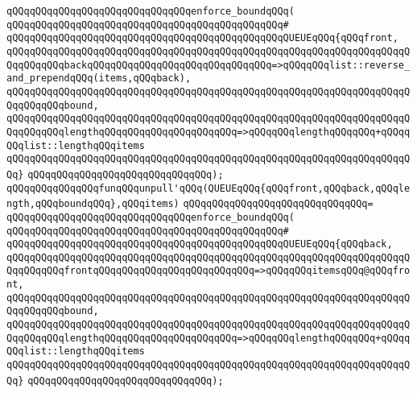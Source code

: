 \verb|qQQqqQQqqQQqqQQqqQQqqQQqqQQqqQQqenforce_boundqQQq(|\newline
\verb|qQQqqQQqqQQqqQQqqQQqqQQqqQQqqQQqqQQqqQQqqQQqqQQq#|\newline
\verb|qQQqqQQqqQQqqQQqqQQqqQQqqQQqqQQqqQQqqQQqqQQqqQQqQUEUEqQQq{qQQqfront,|\newline
\verb|qQQqqQQqqQQqqQQqqQQqqQQqqQQqqQQqqQQqqQQqqQQqqQQqqQQqqQQqqQQqqQQqqQQqqQQqqQQqqQQqbackqQQqqQQqqQQqqQQqqQQqqQQqqQQqqQQq=>qQQqqQQqlist::reverse_and_prependqQQq(items,qQQqback),|\newline
\verb|qQQqqQQqqQQqqQQqqQQqqQQqqQQqqQQqqQQqqQQqqQQqqQQqqQQqqQQqqQQqqQQqqQQqqQQqqQQqqQQqbound,|\newline
\verb|qQQqqQQqqQQqqQQqqQQqqQQqqQQqqQQqqQQqqQQqqQQqqQQqqQQqqQQqqQQqqQQqqQQqqQQqqQQqqQQqlengthqQQqqQQqqQQqqQQqqQQqqQQq=>qQQqqQQqlengthqQQqqQQq+qQQqqQQqlist::lengthqQQqitems|\newline
\verb|qQQqqQQqqQQqqQQqqQQqqQQqqQQqqQQqqQQqqQQqqQQqqQQqqQQqqQQqqQQqqQQqqQQqqQQq}|\newline
\verb|qQQqqQQqqQQqqQQqqQQqqQQqqQQqqQQq);|\newline
\newline
\verb|qQQqqQQqqQQqqQQqfunqQQqunpull'qQQq(QUEUEqQQq{qQQqfront,qQQqback,qQQqlength,qQQqboundqQQq},qQQqitems)|\newline
\verb|qQQqqQQqqQQqqQQqqQQqqQQqqQQqqQQq=|\newline
\verb|qQQqqQQqqQQqqQQqqQQqqQQqqQQqqQQqenforce_boundqQQq(|\newline
\verb|qQQqqQQqqQQqqQQqqQQqqQQqqQQqqQQqqQQqqQQqqQQqqQQq#|\newline
\verb|qQQqqQQqqQQqqQQqqQQqqQQqqQQqqQQqqQQqqQQqqQQqqQQqQUEUEqQQq{qQQqback,|\newline
\verb|qQQqqQQqqQQqqQQqqQQqqQQqqQQqqQQqqQQqqQQqqQQqqQQqqQQqqQQqqQQqqQQqqQQqqQQqqQQqqQQqfrontqQQqqQQqqQQqqQQqqQQqqQQqqQQq=>qQQqqQQqitemsqQQq@qQQqfront,|\newline
\verb|qQQqqQQqqQQqqQQqqQQqqQQqqQQqqQQqqQQqqQQqqQQqqQQqqQQqqQQqqQQqqQQqqQQqqQQqqQQqqQQqbound,|\newline
\verb|qQQqqQQqqQQqqQQqqQQqqQQqqQQqqQQqqQQqqQQqqQQqqQQqqQQqqQQqqQQqqQQqqQQqqQQqqQQqqQQqlengthqQQqqQQqqQQqqQQqqQQqqQQq=>qQQqqQQqlengthqQQqqQQq+qQQqqQQqlist::lengthqQQqitems|\newline
\verb|qQQqqQQqqQQqqQQqqQQqqQQqqQQqqQQqqQQqqQQqqQQqqQQqqQQqqQQqqQQqqQQqqQQqqQQq}|\newline
\verb|qQQqqQQqqQQqqQQqqQQqqQQqqQQqqQQq);|\newline
\newline
